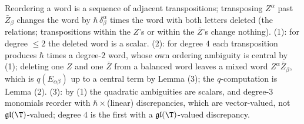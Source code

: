 Reordering a word is a sequence of adjacent transpositions; transposing $Z^\alpha$ past $\bar Z_\beta$ changes the word by $\hbar\,\delta^\alpha_\beta$ times the word with both letters deleted (the relations; transpositions within the $Z$'s or within the $\bar Z$'s change nothing). (1): for degree $\le 2$ the deleted word is a scalar. (2): for degree $4$ each transposition produces $\hbar$ times a degree-$2$ word, whose own ordering ambiguity is central by (1); deleting one $Z$ and one $\bar Z$ from a balanced word leaves a mixed word $Z^\alpha\bar Z_\beta$, which is $q(E_{\alpha\beta})$ up to a central term by Lemma (3); the $q$-computation is Lemma (2). (3): by (1) the quadratic ambiguities are scalars, and degree-$3$ monomials reorder with $\hbar\times$(linear) discrepancies, which are vector-valued, not $\mathfrak{gl}(\T)$-valued; degree $4$ is the first with a $\mathfrak{gl}(\T)$-valued discrepancy.

